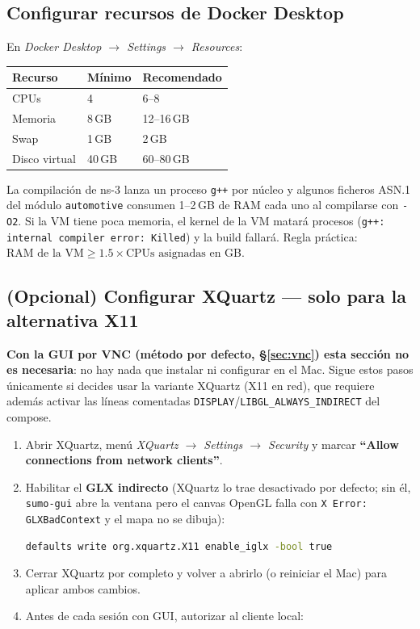 \documentclass[11pt,a4paper]{article}
\begin{document}
\subsection{Configurar recursos de Docker Desktop}

En \emph{Docker Desktop $\to$ Settings $\to$ Resources}:

\begin{center}
\small
\begin{tabular}{@{}lll@{}}
\toprule
\textbf{Recurso} & \textbf{M\'inimo} & \textbf{Recomendado} \\
\midrule
CPUs      & 4        & 6--8 \\
Memoria   & 8\,GB    & 12--16\,GB \\
Swap      & 1\,GB    & 2\,GB \\
Disco virtual & 40\,GB & 60--80\,GB \\
\bottomrule
\end{tabular}
\end{center}

\begin{implicacion}
La compilaci\'on de ns-3 lanza un proceso \texttt{g++} por n\'ucleo y algunos
ficheros ASN.1 del m\'odulo \texttt{automotive} consumen 1--2\,GB de RAM cada
uno al compilarse con \texttt{-O2}. Si la VM tiene poca memoria, el kernel de
la VM matar\'a procesos (\texttt{g++: internal compiler error: Killed}) y la
build fallar\'a. Regla pr\'actica: $\text{RAM de la VM} \geq 1.5 \times
\text{CPUs asignadas}$ en GB.
\end{implicacion}

\subsection{(Opcional) Configurar XQuartz --- solo para la alternativa X11}
\label{sec:xquartzconf}

\textbf{Con la GUI por VNC (m\'etodo por defecto, \S\ref{sec:vnc}) esta
secci\'on no es necesaria}: no hay nada que instalar ni configurar en el Mac.
Sigue estos pasos \'unicamente si decides usar la variante XQuartz (X11 en
red), que requiere adem\'as activar las l\'ineas comentadas
\texttt{DISPLAY}/\texttt{LIBGL\_ALWAYS\_INDIRECT} del compose.

\begin{enumerate}
  \item Abrir XQuartz, men\'u \emph{XQuartz $\to$ Settings $\to$ Security} y
  marcar \textbf{``Allow connections from network clients''}.
  \item Habilitar el \textbf{GLX indirecto} (XQuartz lo trae desactivado por
  defecto; sin \'el, \texttt{sumo-gui} abre la ventana pero el canvas OpenGL
  falla con \texttt{X Error: GLXBadContext} y el mapa no se dibuja):
\begin{lstlisting}[language=bash]
defaults write org.xquartz.X11 enable_iglx -bool true
\end{lstlisting}
  \item Cerrar XQuartz por completo y volver a abrirlo (o reiniciar el Mac)
  para aplicar ambos cambios.
  \item Antes de cada sesi\'on con GUI, autorizar al cliente local:
\end{enumerate}
\end{document}
